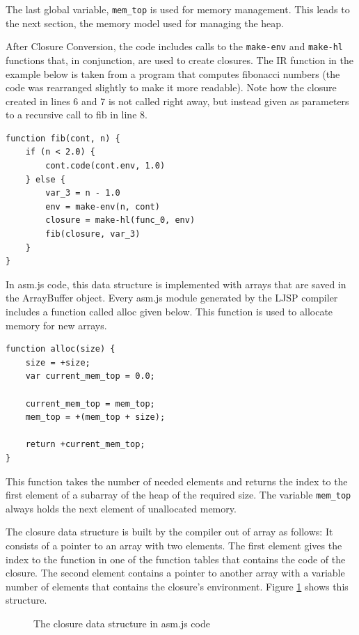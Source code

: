 \documentclass[11pt]{report}
\begin{document}
The last global variable, \texttt{mem_top} is used for memory management. This leads to the next section, the memory model used for managing the heap.

After Closure Conversion, the code includes calls to the \texttt{make-env} and \texttt{make-hl} functions that, in conjunction, are used to create closures.  The IR function in the example below is taken from a program that computes fibonacci numbers (the code was rearranged slightly to make it more readable). Note how the closure created in lines 6 and 7 is not called right away, but instead given as parameters to a recursive call to fib in line 8.

\begin{lstlisting}
function fib(cont, n) {
    if (n < 2.0) {
        cont.code(cont.env, 1.0)
    } else {
        var_3 = n - 1.0
        env = make-env(n, cont)
        closure = make-hl(func_0, env)
        fib(closure, var_3)
    }
}
\end{lstlisting}

In asm.js code, this data structure is implemented with arrays that are saved in the ArrayBuffer object. Every asm.js module generated by the LJSP compiler includes a function called alloc given below. This function is used to allocate memory for new arrays.

\begin{lstlisting}
function alloc(size) {
    size = +size;
    var current_mem_top = 0.0;

    current_mem_top = mem_top;
    mem_top = +(mem_top + size);

    return +current_mem_top;
}
\end{lstlisting}

This function takes the number of needed elements and returns the index to the first element of a subarray of the heap of the required size. The variable \texttt{mem_top} always holds the next element of unallocated memory.

The closure data structure is built by the compiler out of array as follows: It consists of a pointer to an array with two elements. The first element gives the index to the function in one of the function tables that contains the code of the closure. The second element contains a pointer to another array with a variable number of elements that contains the closure's environment. Figure \ref{asmjsclosure} shows this structure.

\begin{figure}[ht]
\caption{The closure data structure in asm.js code}
\label{asmjsclosure}
\end{figure}
\end{document}
